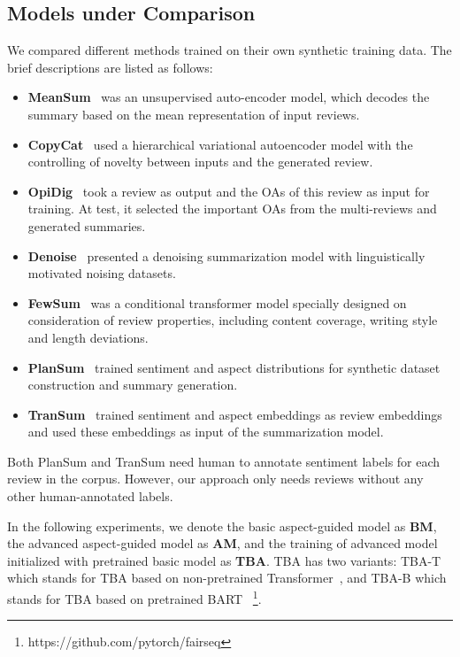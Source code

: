\subsection{Models under Comparison}
\label{sec:base}
We compared different methods trained on their own synthetic training data.
The brief descriptions are listed as follows:
\begin{itemize}
	\item \textbf{MeanSum}~\cite{MeanSum19} was an unsupervised auto-encoder model, which decodes the summary based on the mean representation of input reviews.
	\item \textbf{CopyCat}~\cite{Copycat20} used a hierarchical variational autoencoder model with the controlling of novelty between inputs and the generated review.
	\item \textbf{OpiDig}~\cite{OpiDig20} took a review as output and the OAs of this review as input for training. At test, it selected the important OAs from the multi-reviews
	and generated summaries.
	\item \textbf{Denoise}~\cite{Denoise20} presented a denoising summarization model with linguistically motivated noising datasets.
	\item \textbf{FewSum}~\cite{Fewshot20} was a conditional transformer model specially designed on consideration of review properties, including content coverage, writing style and length deviations.
	\item \textbf{PlanSum}~\cite{Plansum20} trained sentiment and aspect distributions for synthetic dataset construction and summary generation.
	\item \textbf{TranSum}~\cite{transsum21} trained sentiment and aspect embeddings as review embeddings and used these embeddings as input of the summarization model.
\end{itemize}
Both PlanSum and TranSum 
need human to annotate sentiment labels
for each review in the corpus.
However, our approach only needs reviews without any other human-annotated labels.

In the following experiments, we denote the basic aspect-guided model as {\bf BM}, 
the advanced aspect-guided model as {\bf AM}, 
and the training of advanced model initialized with pretrained basic model as {\bf TBA}. TBA has two variants: TBA-T which 
stands for TBA based on non-pretrained Transformer~\cite{Transformer17}, and TBA-B which stands for TBA based on pretrained BART~\cite{BART20}
\footnote{https://github.com/pytorch/fairseq}.

